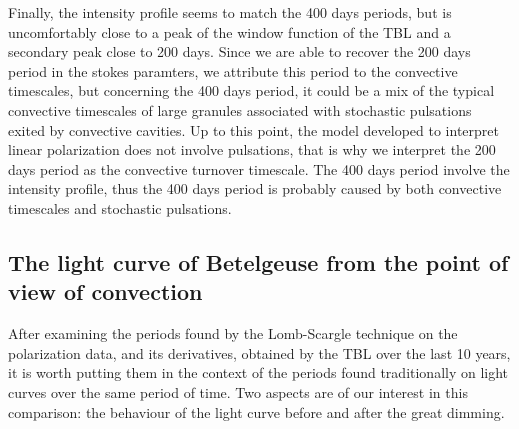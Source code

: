 \documentclass{aa}
\begin{document}
Finally, the intensity profile seems to match the 400 days periods, but is uncomfortably close to a peak of the window function of the TBL and a secondary peak close to 200 days. Since we are able to recover the 200 days period in the stokes paramters, we attribute this period to the convective timescales, but concerning the 400 days period, it could be a mix of the typical convective timescales of large granules associated with stochastic pulsations exited by convective cavities. Up to this point, the model developed to interpret linear polarization does not involve pulsations, that is why we interpret the 200 days period as the convective turnover timescale. The 400 days period involve the intensity profile, thus the 400 days period is probably caused by both convective timescales and stochastic pulsations.

\subsection{The light curve of Betelgeuse from the point of view of convection}

After examining the periods found by the Lomb-Scargle technique on the polarization data, and its derivatives, obtained by the TBL over the last 
10 years, it is worth putting them in the context of the periods found traditionally on light curves over the same period of time. Two aspects 
are of our interest in this comparison: the behaviour of the light curve before and after the great dimming.

\end{document}

